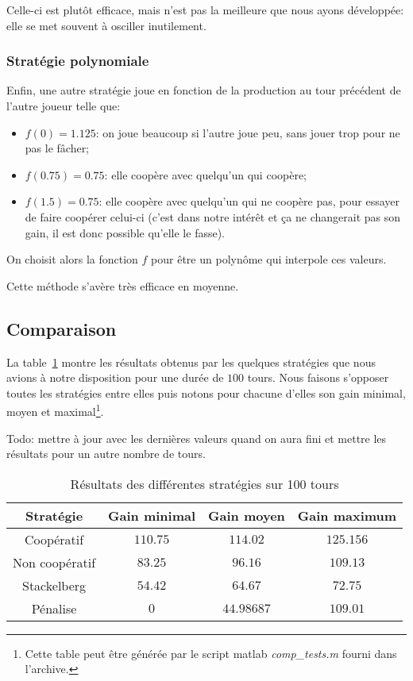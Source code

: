 \documentclass{scrartcl}
\begin{document}
      Celle-ci est plutôt efficace, mais n'est pas la meilleure que nous ayons
      développée: elle se met souvent à osciller inutilement.

    \subsubsection{Stratégie polynomiale}
      Enfin, une autre stratégie joue en fonction de la production au tour
      précédent de l'autre joueur telle que:
      \begin{itemize}
        \item $f(0) = 1.125$: on joue beaucoup si l'autre joue peu, sans jouer
          trop pour ne pas le fâcher;
        \item $f(0.75) = 0.75$: elle coopère avec quelqu'un qui coopère;
        \item $f(1.5) = 0.75$: elle coopère avec quelqu'un qui ne coopère pas,
          pour essayer de faire coopérer celui-ci (c'est dans notre intérêt et
          ça ne changerait pas son gain, il est donc possible qu'elle le
          fasse).
      \end{itemize}

      On choisit alors la fonction $f$ pour être un polynôme qui interpole ces
      valeurs.

      Cette méthode s'avère très efficace en moyenne.

  \subsection{Comparaison}
    La table~\ref{table:coop_results} montre les résultats obtenus par les
    quelques stratégies que nous avions à notre disposition pour une durée de
    $100$ tours. Nous faisons s'opposer toutes les stratégies entre elles puis
    notons pour chacune d'elles son gain minimal, moyen et
    maximal\footnote{Cette table peut être générée par le script matlab
    \textit{comp\_tests.m} fourni dans l'archive.}.

    Todo: mettre à jour avec les dernières valeurs quand on aura fini et mettre
    les résultats pour un autre nombre de tours.
    \begin{table}[h]
      \centering
      \begin{tabular}{|c||c|c|c|}
        \hline
        Stratégie      & Gain minimal & Gain moyen & Gain maximum \\\hline\hline
        Coopératif     & $110.75$     & $114.02$   & $125.156$    \\\hline
        Non coopératif & $83.25$      & $96.16$    & $109.13$     \\\hline
        Stackelberg    & $54.42$      & $64.67$    & $72.75$      \\\hline
        Pénalise       & $0$          & $44.98687$ & $109.01$     \\\hline
      \end{tabular}
      \caption{Résultats des différentes stratégies sur 100 tours}
      \label{table:coop_results}
    \end{table}
    
\end{document}
